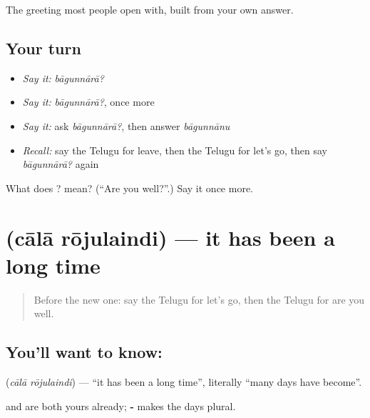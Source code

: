 \begin{grammarlens}[title={What you've built}]
The greeting most people open with, built from your own answer.
\end{grammarlens}

\subsection*{Your turn}
\begin{itemize}
\raggedright
  \item \emph{Say it:} \emph{bāgunnārā?}
  \item \emph{Say it:} \emph{bāgunnārā?}, once more
  \item \emph{Say it:} ask \emph{bāgunnārā?}, then answer \emph{bāgunnānu}
  \item \emph{Recall:} say the Telugu for leave, then the Telugu for let's go, then say \emph{bāgunnārā?} again
\end{itemize}

\begin{tcolorbox}[breakable,colback=teal!4,colframe=teal!35!black,title={Before you move on}]
What does ? mean? (\textquotedblleft{}Are you well?\textquotedblright{}.) Say it once more.
\end{tcolorbox}
\section[\texorpdfstring{\te{చాలా} \te{రోజులైంది} (cālā rōjulaindi)}{చాలా రోజులైంది (cālā rōjulaindi)}]{  (cālā rōjulaindi) — it has been a long time}

\label{lesson:TE-C91-longtime}



\begin{quote}
Before the new one: say the Telugu for let's go, then the Telugu for are you well.
\end{quote}

\subsection*{You'll want to know:  }
\textbf{ } (\emph{cālā rōjulaindi}) — \textquotedblleft{}it has been a long time\textquotedblright{}, literally \textquotedblleft{}many days have become\textquotedblright{}.

\textbf{} and \textbf{} are both yours already; \textbf{-} makes the days plural.

